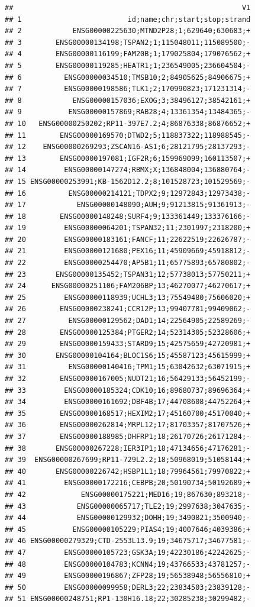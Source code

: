 \documentclass[
]{book}
\begin{document}
\begin{verbatim}
##                                                      V1
## 1                         id;name;chr;start;stop;strand
## 2            ENSG00000225630;MTND2P28;1;629640;630683;+
## 3        ENSG00000134198;TSPAN2;1;115048011;115089500;-
## 4        ENSG00000116199;FAM20B;1;179025804;179076562;+
## 5        ENSG00000119285;HEATR1;1;236549005;236604504;-
## 6          ENSG00000034510;TMSB10;2;84905625;84906675;+
## 7          ENSG00000198586;TLK1;2;170990823;171231314;-
## 8            ENSG00000157036;EXOG;3;38496127;38542161;+
## 9           ENSG00000157869;RAB28;4;13361354;13484365;-
## 10   ENSG00000250202;RP11-397E7.2;4;86876338;86876652;+
## 11        ENSG00000169570;DTWD2;5;118837322;118988545;-
## 12    ENSG00000269293;ZSCAN16-AS1;6;28121795;28137293;-
## 13        ENSG00000197081;IGF2R;6;159969099;160113507;+
## 14         ENSG00000147274;RBMX;X;136848004;136880764;-
## 15 ENSG00000253991;KB-1562D12.2;8;101528723;101529569;-
## 16          ENSG00000214121;TDPX2;9;12972843;12973438;-
## 17            ENSG00000148090;AUH;9;91213815;91361913;-
## 18        ENSG00000148248;SURF4;9;133361449;133376166;-
## 19         ENSG00000064201;TSPAN32;11;2301997;2318200;+
## 20         ENSG00000183161;FANCF;11;22622519;22626787;-
## 21         ENSG00000121680;PEX16;11;45909669;45918812;-
## 22         ENSG00000254470;AP5B1;11;65775893;65780802;-
## 23       ENSG00000135452;TSPAN31;12;57738013;57750211;+
## 24      ENSG00000251106;FAM206BP;13;46270077;46270617;+
## 25         ENSG00000118939;UCHL3;13;75549480;75606020;+
## 26        ENSG00000238241;CCR12P;13;99407781;99409062;-
## 27          ENSG00000129562;DAD1;14;22564905;22589269;-
## 28        ENSG00000125384;PTGER2;14;52314305;52328606;+
## 29        ENSG00000159433;STARD9;15;42575659;42720981;+
## 30       ENSG00000104164;BLOC1S6;15;45587123;45615999;+
## 31          ENSG00000140416;TPM1;15;63042632;63071915;+
## 32        ENSG00000167005;NUDT21;16;56429133;56452199;-
## 33         ENSG00000185324;CDK10;16;89680737;89696364;+
## 34         ENSG00000161692;DBF4B;17;44708608;44752264;+
## 35        ENSG00000168517;HEXIM2;17;45160700;45170040;+
## 36        ENSG00000262814;MRPL12;17;81703357;81707526;+
## 37        ENSG00000188985;DHFRP1;18;26170726;26171284;-
## 38       ENSG00000267228;IER3IP1;18;47134656;47176281;-
## 39  ENSG00000267699;RP11-729L2.2;18;50968019;51058144;+
## 40       ENSG00000226742;HSBP1L1;18;79964561;79970822;+
## 41         ENSG00000172216;CEBPB;20;50190734;50192689;+
## 42             ENSG00000175221;MED16;19;867630;893218;-
## 43            ENSG00000065717;TLE2;19;2997638;3047635;-
## 44            ENSG00000129932;DOHH;19;3490821;3500940;-
## 45           ENSG00000105229;PIAS4;19;4007646;4039386;+
## 46 ENSG00000279329;CTD-2553L13.9;19;34675717;34677581;-
## 47         ENSG00000105723;GSK3A;19;42230186;42242625;-
## 48         ENSG00000104783;KCNN4;19;43766533;43781257;-
## 49         ENSG00000196867;ZFP28;19;56538948;56556810;+
## 50         ENSG00000099958;DERL3;22;23834503;23839128;-
## 51 ENSG00000248751;RP1-130H16.18;22;30285238;30299482;-
\end{verbatim}
\end{document}
